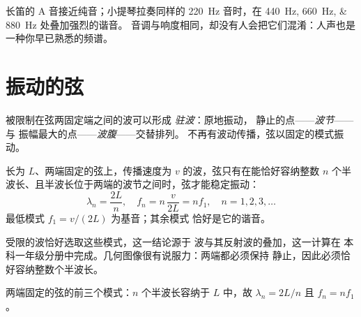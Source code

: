 \begin{example}[为何能听出来电者]\label{ex:g12:sound-acoustics:two-instruments}
长笛的 A 音接近纯音；小提琴拉奏同样的
\qty{220}{Hz} 音时，在 \qtylist{440;660;880}{Hz} 处叠加强烈的谐音。
音调与响度相同，却没有人会把它们混淆：人声也是
一种你早已熟悉的频谱。
\end{example}

\section{振动的弦}

\begin{definition}[驻波]\label{def:g12:sound-acoustics:standing-wave}
被限制在弦两固定端之间的波可以形成
\emph{驻波}：原地振动，
静止的点——\emph{波节}——与
振幅最大的点——\emph{波腹}——交替排列。
不再有波动传播，弦以固定的模式振动。
\end{definition}

\begin{proposition}[弦的振动模式]\label{prop:g12:sound-acoustics:string-modes}
长为 $L$、两端固定的弦上，传播速度为
$v$ 的波，弦只有在能恰好容纳整数 $n$
个半波长、且半波长位于两端的波节之间时，弦才能稳定振动：
\[ \lambda_n = \frac{2L}{n}, \quad f_n = n\,\frac{v}{2L} = n f_1, \quad n = 1, 2, 3, \dots \]
最低模式 $f_1 = v/(2L)$ 为基音；其余模式
恰好是它的谐音。\admitted
\end{proposition}

\begin{remark}[诚实的证明在哪里]\label{rem:g12:sound-acoustics:honest}
受限的波恰好选取这些模式，这一结论源于
波与其反射波的叠加，这一计算在
本科一年级分册中完成。几何图像很有说服力：两端都必须保持
静止，因此必须恰好容纳整数个半波长。
\end{remark}

\begin{omfigure}

{\small 两端固定的弦的前三个模式：$n$
个半波长容纳于 $L$ 中，故 $\lambda_n = 2L/n$ 且 $f_n = nf_1$。}
\end{omfigure}


